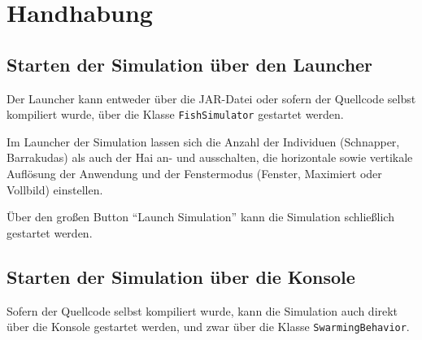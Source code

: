 \documentclass[11pt]{article}
\begin{document}
\section{Handhabung}
\subsection{Starten der Simulation über den Launcher}
Der Launcher kann entweder über die JAR-Datei oder sofern der Quellcode selbst kompiliert wurde, über die Klasse \lstinline{FishSimulator} gestartet werden.

\vspace{0.5em}
Im Launcher der Simulation lassen sich die Anzahl der Individuen (Schnapper, Barrakudas) als auch der Hai an- und ausschalten, die horizontale sowie vertikale Auflösung der Anwendung und der Fenstermodus (Fenster, Maximiert oder Vollbild) einstellen.

\vspace{0.5em}
Über den großen Button ``Launch Simulation'' kann die Simulation schließlich gestartet werden.
\newpage
\subsection{Starten der Simulation über die Konsole}
Sofern der Quellcode selbst kompiliert wurde, kann die Simulation auch direkt über die Konsole gestartet werden, und zwar über die Klasse \lstinline{SwarmingBehavior}.
\end{document}
